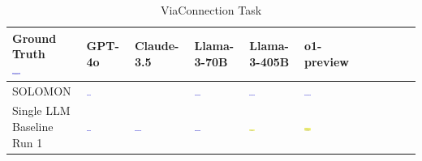 \begin{table}
  \caption{ViaConnection Task}
  \label{table:viaconnection}
  \centering
  \begin{tabular}{@{}mmmmmm@{}}
    \toprule
    \makecell{Ground Truth \\ \includegraphics[width=0.13\textwidth]{examples_png/ViaConnection.png}} & GPT-4o & Claude-3.5 & Llama-3-70B & Llama-3-405B & o1-preview \\
    \midrule
    SOLOMON & \includegraphics[width=0.13\textwidth]{./pool_all/png/gpt-4o_results/ViaConnection.png} &  & \includegraphics[width=0.13\textwidth]{./pool_all/png/claude-3-5-sonnet-20240620_results/ViaConnection.png} & \includegraphics[width=0.13\textwidth]{./pool_all/png/watsonx_meta-llama_llama-3-1-70b-instruct_results/ViaConnection.png} & \includegraphics[width=0.13\textwidth]{./pool_all/png/watsonx_meta-llama_llama-3-405b-instruct_results/ViaConnection.png} \\
    \makecell{Single LLM \\ Baseline \\ Run 1} & \includegraphics[width=0.13\textwidth]{./run_1/png/gpt-4o_results/ViaConnection.png} & \includegraphics[width=0.13\textwidth]{./run_1/png/o1-preview_results/ViaConnection.png} & \includegraphics[width=0.13\textwidth]{./run_1/png/claude-3-5-sonnet-20240620_results/ViaConnection.png} & \includegraphics[width=0.13\textwidth]{./run_1/png/watsonx_meta-llama_llama-3-1-70b-instruct_results/ViaConnection.png} & \includegraphics[width=0.13\textwidth]{./run_1/png/watsonx_meta-llama_llama-3-405b-instruct_results/ViaConnection.png} \\

\end{tabular}
\end{table}
